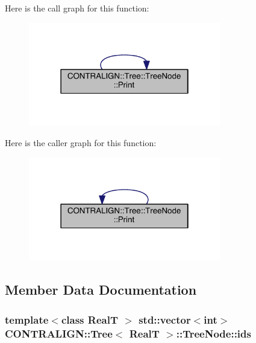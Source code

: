 Here is the call graph for this function\+:
\nopagebreak
\begin{figure}[H]
\begin{center}
\leavevmode
\includegraphics[width=238pt]{struct_c_o_n_t_r_a_l_i_g_n_1_1_tree_1_1_tree_node_a86f165d26dab0e4916f2a9d487ba6f49_cgraph}
\end{center}
\end{figure}




Here is the caller graph for this function\+:
\nopagebreak
\begin{figure}[H]
\begin{center}
\leavevmode
\includegraphics[width=238pt]{struct_c_o_n_t_r_a_l_i_g_n_1_1_tree_1_1_tree_node_a86f165d26dab0e4916f2a9d487ba6f49_icgraph}
\end{center}
\end{figure}




\subsection{Member Data Documentation}
\hypertarget{struct_c_o_n_t_r_a_l_i_g_n_1_1_tree_1_1_tree_node_af0ba8bc52781c6857f116f17f8c5ca14}{
\subsubsection[{ids}]{\setlength{\rightskip}{0pt plus 5cm}template$<$class Real\+T $>$ std\+::vector$<$int$>$ {\bf C\+O\+N\+T\+R\+A\+L\+I\+G\+N\+::\+Tree}$<$ Real\+T $>$\+::Tree\+Node\+::ids}}\label{struct_c_o_n_t_r_a_l_i_g_n_1_1_tree_1_1_tree_node_af0ba8bc52781c6857f116f17f8c5ca14}


